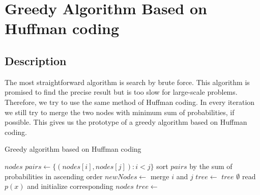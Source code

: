 \section{Greedy Algorithm Based on Huffman coding}

\subsection{Description}


	

The most straightforward algorithm is search by brute force. This algorithm is promised to find the precise result but is too slow for large-scale problems. Therefore, we try to use the same method of Huffman coding. In every iteration we still try to merge the two nodes with minimum sum of probabilities, if possible. This gives us the prototype of a greedy algorithm based on Huffman coding.

\begin{algorithm}
	\caption{Greedy algorithm based on Huffman coding} 
	\begin{algorithmic}[1]
	        \State \Return $nodes$
	    \EndIf
	    \State $pairs \gets \{(nodes[i], nodes[j]): i < j\}$
	    \State sort $pairs$ by the sum of probabilities in ascending order
        		    \State $newNodes \gets$ merge $i$ and $j$
        		    \State $tree \gets$ 
        		        \State \Return $tree$
        		    \EndIf
                \EndIf
        \EndFor
        \State \Return $\emptyset$
    \EndProcedure
	\State read $p(x)$ and initialize corresponding $nodes$
	\State $tree \gets$ 
	\end{algorithmic} 
	
\end{algorithm}

